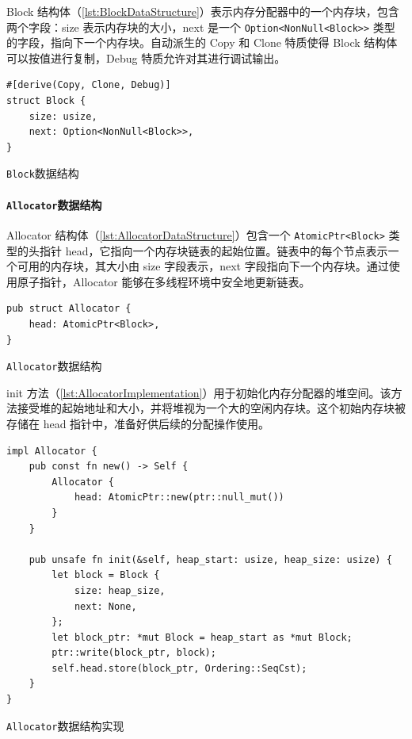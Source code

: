 Block 结构体（\cref{lst:BlockDataStructure}）表示内存分配器中的一个内存块，包含两个字段：size 表示内存块的大小，next 是一个 \texttt{Option<NonNull<Block>>} 类型的字段，指向下一个内存块。自动派生的 Copy 和 Clone 特质使得 Block 结构体可以按值进行复制，Debug 特质允许对其进行调试输出。

\begin{listing}[htbp]
    \begin{verbatim}
#[derive(Copy, Clone, Debug)]
struct Block {
    size: usize,
    next: Option<NonNull<Block>>,
}
    \end{verbatim}
    \caption{\texttt{Block}数据结构}\label{lst:BlockDataStructure}
\end{listing}

\paragraph{\texttt{Allocator}数据结构}

Allocator 结构体（\cref{lst:AllocatorDataStructure}）包含一个 \texttt{AtomicPtr<Block>} 类型的头指针 head，它指向一个内存块链表的起始位置。链表中的每个节点表示一个可用的内存块，其大小由 size 字段表示，next 字段指向下一个内存块。通过使用原子指针，Allocator 能够在多线程环境中安全地更新链表。

\begin{listing}[htbp]
    \begin{verbatim}
pub struct Allocator {
    head: AtomicPtr<Block>,
}
    \end{verbatim}
    \caption{\texttt{Allocator}数据结构}\label{lst:AllocatorDataStructure}
\end{listing}

init 方法（\cref{lst:AllocatorImplementation}）用于初始化内存分配器的堆空间。该方法接受堆的起始地址和大小，并将堆视为一个大的空闲内存块。这个初始内存块被存储在 head 指针中，准备好供后续的分配操作使用。

\begin{listing}[htbp]
    \begin{verbatim}
impl Allocator {
    pub const fn new() -> Self {
        Allocator {
            head: AtomicPtr::new(ptr::null_mut())
        }
    }

    pub unsafe fn init(&self, heap_start: usize, heap_size: usize) {
        let block = Block {
            size: heap_size,
            next: None,
        };
        let block_ptr: *mut Block = heap_start as *mut Block;
        ptr::write(block_ptr, block);
        self.head.store(block_ptr, Ordering::SeqCst);
    }
}
    \end{verbatim}
    \caption{\texttt{Allocator}数据结构实现}\label{lst:AllocatorImplementation}
\end{listing}

